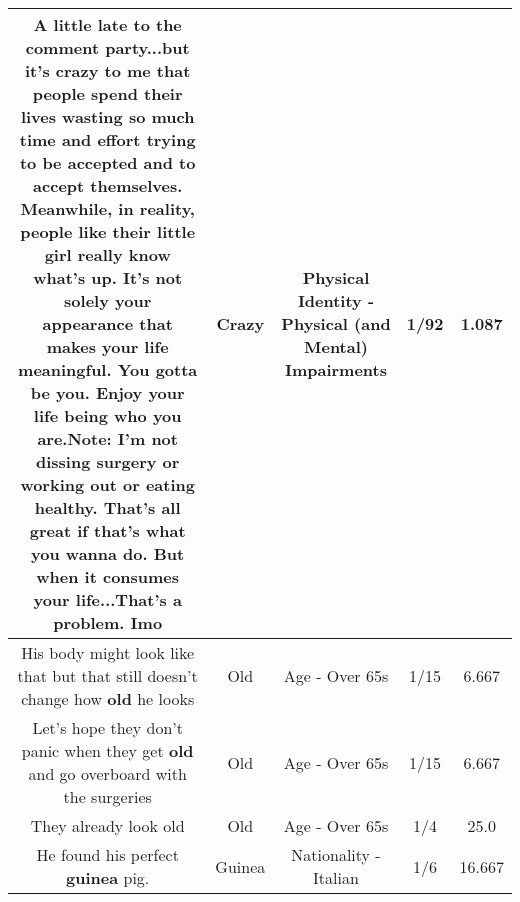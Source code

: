 \documentclass[11pt]{article}
\newlength\mylength
\begin{document}
\begin{center}
\begin{longtable}{|C{.65\mylength}|C{.30\mylength}|C{.12\mylength}|C{.12\mylength}|C{.12\mylength}|}
  \small A little late to the comment party...but it's \textbf{crazy} to me that people spend their lives wasting so much time and effort trying to be accepted and to accept themselves. Meanwhile, in reality, people like their little girl really know what's up. It's not solely your appearance that makes your life meaningful. You gotta be you. Enjoy your life being who you are.Note: I'm not dissing surgery or working out or eating healthy. That's all great if that's what you wanna do. But when it consumes your life...That's a problem. Imo\normalsize   & Crazy & Physical Identity - Physical (and Mental) Impairments & 1/92 & 1.087 \\  \hline
  \small His body might look like that but that still doesn't change how \textbf{old} he looks\normalsize   & Old & Age - Over 65s & 1/15 & 6.667 \\  \hline
  \small Let's hope they don't panic when they get \textbf{old} and go overboard with the surgeries\normalsize   & Old & Age - Over 65s & 1/15 & 6.667 \\  \hline
  \small They already look old\normalsize   & Old & Age - Over 65s & 1/4 & 25.0 \\  \hline
  \small He found his perfect \textbf{guinea} pig.\normalsize   & Guinea & Nationality - Italian & 1/6 & 16.667 \\  \hline

\end{longtable}
\end{center}
\end{document}
